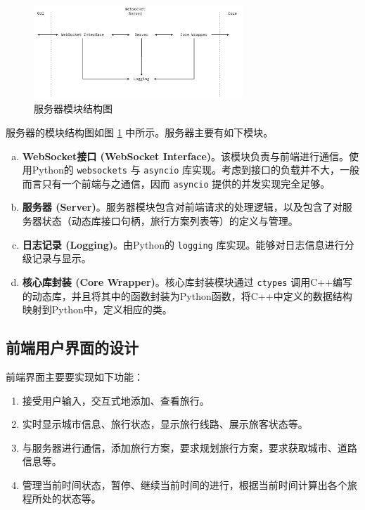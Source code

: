 \begin{figure}[t]
  \centering
  \includegraphics[width=0.7\textwidth]{figures/server_arch}
  \caption{服务器模块结构图}
  \label{fig:server-arch}
\end{figure}

{
服务器的模块结构图如图 \ref{fig:server-arch} 中所示。服务器主要有如下模块。
\begin{enumerate}[(a)]
  \item \textbf{WebSocket接口 (WebSocket Interface)}。该模块负责与前端进行通信。使用Python的 \lstinline{websockets} 与 \lstinline{asyncio} 库实现。考虑到接口的负载并不大，一般而言只有一个前端与之通信，因而 \lstinline{asyncio} 提供的并发实现完全足够。
  \item \textbf{服务器 (Server)}。服务器模块包含对前端请求的处理逻辑，以及包含了对服务器状态（动态库接口句柄，旅行方案列表等）的定义与管理。
  \item \textbf{日志记录 (Logging)}。由Python的 \lstinline{logging} 库实现。能够对日志信息进行分级记录与显示。
  \item \textbf{核心库封装 (Core Wrapper)}。核心库封装模块通过 \lstinline{ctypes} 调用C++编写的动态库，并且将其中的函数封装为Python函数，将C++中定义的数据结构映射到Python中，定义相应的类。
\end{enumerate}}

\subsection{前端用户界面的设计}

前端界面主要要实现如下功能：
\begin{enumerate}
  \item 接受用户输入，交互式地添加、查看旅行。
  \item 实时显示城市信息、旅行状态，显示旅行线路、展示旅客状态等。
  \item 与服务器进行通信，添加旅行方案，要求规划旅行方案，要求获取城市、道路信息等。
  \item 管理当前时间状态，暂停、继续当前时间的进行，根据当前时间计算出各个旅程所处的状态等。
\end{enumerate}

